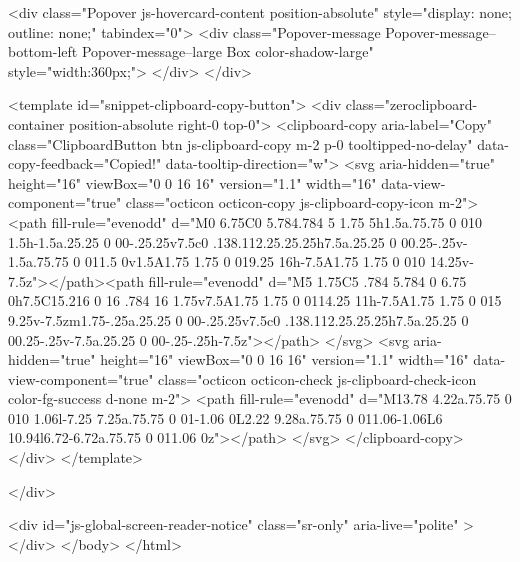     <div class="Popover js-hovercard-content position-absolute" style="display: none; outline: none;" tabindex="0">
  <div class="Popover-message Popover-message--bottom-left Popover-message--large Box color-shadow-large" style="width:360px;">
  </div>
</div>

    <template id="snippet-clipboard-copy-button">
  <div class="zeroclipboard-container position-absolute right-0 top-0">
    <clipboard-copy aria-label="Copy" class="ClipboardButton btn js-clipboard-copy m-2 p-0 tooltipped-no-delay" data-copy-feedback="Copied!" data-tooltip-direction="w">
      <svg aria-hidden="true" height="16" viewBox="0 0 16 16" version="1.1" width="16" data-view-component="true" class="octicon octicon-copy js-clipboard-copy-icon m-2">
    <path fill-rule="evenodd" d="M0 6.75C0 5.784.784 5 1.75 5h1.5a.75.75 0 010 1.5h-1.5a.25.25 0 00-.25.25v7.5c0 .138.112.25.25.25h7.5a.25.25 0 00.25-.25v-1.5a.75.75 0 011.5 0v1.5A1.75 1.75 0 019.25 16h-7.5A1.75 1.75 0 010 14.25v-7.5z"></path><path fill-rule="evenodd" d="M5 1.75C5 .784 5.784 0 6.75 0h7.5C15.216 0 16 .784 16 1.75v7.5A1.75 1.75 0 0114.25 11h-7.5A1.75 1.75 0 015 9.25v-7.5zm1.75-.25a.25.25 0 00-.25.25v7.5c0 .138.112.25.25.25h7.5a.25.25 0 00.25-.25v-7.5a.25.25 0 00-.25-.25h-7.5z"></path>
</svg>
      <svg aria-hidden="true" height="16" viewBox="0 0 16 16" version="1.1" width="16" data-view-component="true" class="octicon octicon-check js-clipboard-check-icon color-fg-success d-none m-2">
    <path fill-rule="evenodd" d="M13.78 4.22a.75.75 0 010 1.06l-7.25 7.25a.75.75 0 01-1.06 0L2.22 9.28a.75.75 0 011.06-1.06L6 10.94l6.72-6.72a.75.75 0 011.06 0z"></path>
</svg>
    </clipboard-copy>
  </div>
</template>




    </div>

    <div id="js-global-screen-reader-notice" class="sr-only" aria-live="polite" ></div>
  </body>
</html>

